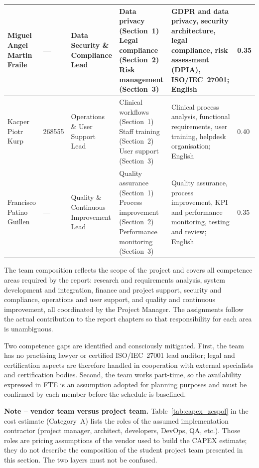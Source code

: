 \begin{longtable}{|L{2.3cm}|C{1.4cm}|L{2.6cm}|L{2.9cm}|L{2.9cm}|C{0.8cm}|}
Miguel Angel Martin Fraile &
--- &
Data Security \& Compliance Lead &
Data privacy (Section~1)\newline
Legal compliance (Section~2)\newline
Risk management (Section~3) &
GDPR and data privacy, security architecture, legal compliance, risk assessment
(DPIA), ISO/IEC~27001; English &
0.35 \\
\hline

Kacper Piotr Kurp &
268555 &
Operations \& User Support Lead &
Clinical workflows (Section~1)\newline
Staff training (Section~2)\newline
User support (Section~3) &
Clinical process analysis, functional requirements, user training, helpdesk
organisation; English &
0.40 \\
\hline

Francisco Patino Guillen &
--- &
Quality \& Continuous Improvement Lead &
Quality assurance (Section~1)\newline
Process improvement (Section~2)\newline
Performance monitoring (Section~3) &
Quality assurance, process improvement, KPI and performance monitoring, testing
and review; English &
0.35 \\
\hline

\end{longtable}

The team composition reflects the scope of the project and covers all competence
areas required by the report: research and requirements analysis, system
development and integration, finance and project support, security and compliance,
operations and user support, and quality and continuous improvement, all
coordinated by the Project Manager. The assignments follow the actual contribution
to the report chapters so that responsibility for each area is unambiguous.

Two competence gaps are identified and consciously mitigated. First, the team has
no practising lawyer or certified ISO/IEC~27001 lead auditor; legal and
certification aspects are therefore handled in cooperation with external
specialists and certification bodies. Second, the team works part-time, so the
availability expressed in FTE is an assumption adopted for planning purposes and
must be confirmed by each member before the schedule is baselined.

\textbf{Note -- vendor team versus project team.} Table~\ref{tab:capex_zespol} in
the cost estimate (Category~A) lists the roles of the assumed implementation
contractor (project manager, architect, developers, DevOps, QA, etc.). Those roles
are pricing assumptions of the vendor used to build the CAPEX estimate; they do
not describe the composition of the student project team presented in this
section. The two layers must not be confused.

